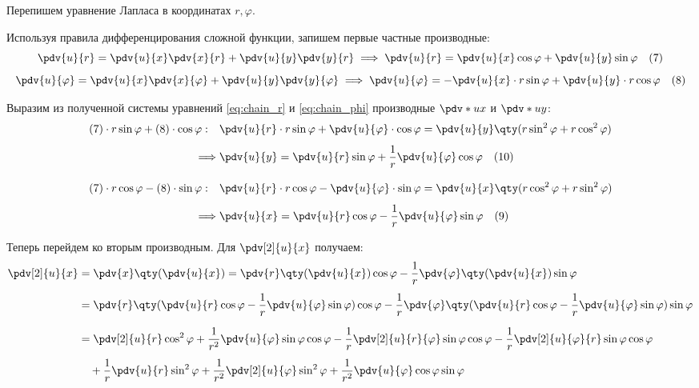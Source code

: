 Перепишем уравнение Лапласа в координатах $r, \varphi$.
\begin{proofbox}
	Используя правила дифференцирования сложной функции, запишем первые частные производные:
	\begin{equation} \label{eq:chain_r}
		\pdv{u}{r} = \pdv{u}{x}\pdv{x}{r} + \pdv{u}{y}\pdv{y}{r} \implies \pdv{u}{r} = \pdv{u}{x}\cos\varphi + \pdv{u}{y}\sin\varphi \quad (7)
	\end{equation}
	\begin{equation} \label{eq:chain_phi}
		\pdv{u}{\varphi} = \pdv{u}{x}\pdv{x}{\varphi} + \pdv{u}{y}\pdv{y}{\varphi} \implies \pdv{u}{\varphi} = -\pdv{u}{x} \cdot r\sin\varphi + \pdv{u}{y} \cdot r\cos\varphi \quad (8)
	\end{equation}
	
	Выразим из полученной системы уравнений \eqref{eq:chain_r} и \eqref{eq:chain_phi} производные $\pdv*{u}{x}$ и $\pdv*{u}{y}$:
	\begin{align*}
		(7)\cdot r\sin\varphi + (8)\cdot \cos\varphi: \quad &\pdv{u}{r} \cdot r\sin\varphi + \pdv{u}{\varphi} \cdot \cos\varphi = \pdv{u}{y}\qty(r\sin^2\varphi + r\cos^2\varphi) \\[1ex]
		\implies &\pdv{u}{y} = \pdv{u}{r}\sin\varphi + \frac{1}{r}\pdv{u}{\varphi}\cos\varphi \quad (10) \\[2ex]
		(7)\cdot r\cos\varphi - (8)\cdot \sin\varphi: \quad &\pdv{u}{r} \cdot r\cos\varphi - \pdv{u}{\varphi} \cdot \sin\varphi = \pdv{u}{x}\qty(r\cos^2\varphi + r\sin^2\varphi) \\[1ex]
		\implies &\pdv{u}{x} = \pdv{u}{r}\cos\varphi - \frac{1}{r}\pdv{u}{\varphi}\sin\varphi \quad (9)
	\end{align*}
	
	Теперь перейдем ко вторым производным. Для $\pdv[2]{u}{x}$ получаем:
	\begin{align*}
		\pdv[2]{u}{x} &= \pdv{x}\qty(\pdv{u}{x}) = \pdv{r}\qty(\pdv{u}{x})\cos\varphi - \frac{1}{r}\pdv{\varphi}\qty(\pdv{u}{x})\sin\varphi \\[1ex]
		&= \pdv{r}\qty(\pdv{u}{r}\cos\varphi - \frac{1}{r}\pdv{u}{\varphi}\sin\varphi)\cos\varphi - \frac{1}{r}\pdv{\varphi}\qty(\pdv{u}{r}\cos\varphi - \frac{1}{r}\pdv{u}{\varphi}\sin\varphi)\sin\varphi \\[1.5ex]
		&= \pdv[2]{u}{r}\cos^2\varphi + \frac{1}{r^2}\pdv{u}{\varphi}\sin\varphi\cos\varphi - \frac{1}{r}\pdv[2]{u}{r}{\varphi}\sin\varphi\cos\varphi - \frac{1}{r}\pdv[2]{u}{\varphi}{r}\sin\varphi\cos\varphi \\[1ex]
		&\quad + \frac{1}{r}\pdv{u}{r}\sin^2\varphi + \frac{1}{r^2}\pdv[2]{u}{\varphi}\sin^2\varphi + \frac{1}{r^2}\pdv{u}{\varphi}\cos\varphi\sin\varphi
	\end{align*}
	

\end{proofbox}
